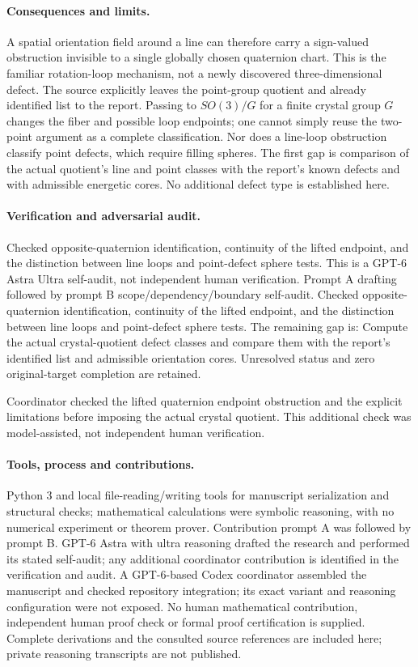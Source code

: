 \documentclass[11pt]{article}
\begin{document}
\paragraph{Consequences and limits.} A spatial orientation field around a line can therefore carry a sign-valued obstruction invisible to a single globally chosen quaternion chart. This is the familiar rotation-loop mechanism, not a newly discovered three-dimensional defect. The source explicitly leaves the point-group quotient and already identified list to the report. Passing to \(SO(3)/G\) for a finite crystal group \(G\) changes the fiber and possible loop endpoints; one cannot simply reuse the two-point argument as a complete classification. Nor does a line-loop obstruction classify point defects, which require filling spheres. The first gap is comparison of the actual quotient's line and point classes with the report's known defects and with admissible energetic cores. No additional defect type is established here.

\paragraph{Verification and adversarial audit.}
Checked opposite-quaternion identification, continuity of the lifted endpoint, and the distinction between line loops and point-defect sphere tests. This is a GPT-6 Astra Ultra self-audit, not independent human verification. Prompt A drafting followed by prompt B scope/dependency/boundary self-audit. Checked opposite-quaternion identification, continuity of the lifted endpoint, and the distinction between line loops and point-defect sphere tests. The remaining gap is: Compute the actual crystal-quotient defect classes and compare them with the report’s identified list and admissible orientation cores. Unresolved status and zero original-target completion are retained.

Coordinator checked the lifted quaternion endpoint obstruction and the explicit limitations before imposing the actual crystal quotient. This additional check was model-assisted, not independent human verification.

\paragraph{Tools, process and contributions.}
Python 3 and local file-reading/writing tools for manuscript serialization and structural checks; mathematical calculations were symbolic reasoning, with no numerical experiment or theorem prover. Contribution prompt A was followed by prompt B. GPT-6 Astra with ultra reasoning drafted the research and performed its stated self-audit; any additional coordinator contribution is identified in the verification and audit. A GPT-6-based Codex coordinator assembled the manuscript and checked repository integration; its exact variant and reasoning configuration were not exposed. No human mathematical contribution, independent human proof check or formal proof certification is supplied. Complete derivations and the consulted source references are included here; private reasoning transcripts are not published.
\end{document}

